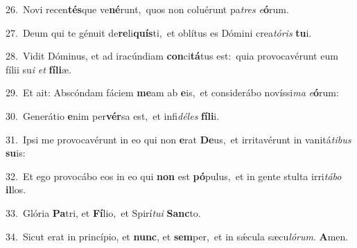 {\numbfont\textcolor{\numbcolor}{26.}}~Novi recen\-\textbf{tés}\-que ve\-\textbf{né}\-runt,~\star quos non coluérunt pa\textit{tres} \textit{e}\-\textbf{ó}rum.\par
{\numbfont\textcolor{\numbcolor}{27.}}~Deum qui te génuit de\-\textbf{re}\-li\-\textbf{quís}\-ti,~\star et oblítus es Dómini crea\-\textit{tó}\-\textit{ris} \textbf{tu}\-i.\par
{\numbfont\textcolor{\numbcolor}{28.}}~Vidit Dóminus, et ad iracúndiam \textbf{con}\-ci\-\textbf{tá}\-tus est:~\star quia provocavérunt eum fílii su\textit{i} \textit{et} \textbf{fí}\-\textbf{li}æ.\par
{\numbfont\textcolor{\numbcolor}{29.}}~Et ait: Abscóndam fáciem \textbf{me}\-am ab \textbf{e}\-is,~\star et considerábo novíssi\textit{ma} \textit{e}\-\textbf{ó}rum:\par
{\numbfont\textcolor{\numbcolor}{30.}}~Generátio \textbf{e}\-nim per\-\textbf{vér}\-sa est,~\star et infi\-\textit{dé}\-\textit{les} \textbf{fí}\-\textbf{li}i.\par
{\numbfont\textcolor{\numbcolor}{31.}}~Ipsi me provocavérunt in eo qui non \textbf{e}\-rat \textbf{De}\-us,~\star et irritavérunt in vanitá\-\textit{ti}\-\textit{bus} \textbf{su}\-is:\par
{\numbfont\textcolor{\numbcolor}{32.}}~Et ego provocábo eos in eo qui \textbf{non} est \textbf{pó}\-pulus,~\star et in gente stulta irri\-\textit{tá}\-\textit{bo} \textbf{il}\-los.\par
{\numbfont\textcolor{\numbcolor}{33.}}~Glória \textbf{Pa}\-tri, et \textbf{Fí}\-lio,~\star et Spirí\-\textit{tu}\-\textit{i} \textbf{Sanc}\-to.\par
{\numbfont\textcolor{\numbcolor}{34.}}~Sicut erat in princípio, et \textbf{nunc}\-, et \textbf{sem}\-per,~\star et in sǽcula sæcu\-\textit{ló}\-\textit{rum}. \textbf{A}\-men.\par
